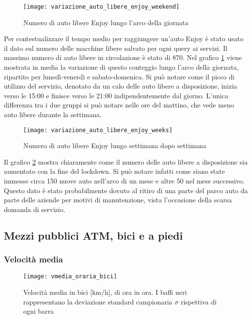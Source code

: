 \begin{figure}[H]
\texttt{[image: variazione\_auto\_libere\_enjoy\_weekend]}
\caption{Numero di auto libere Enjoy lungo l'arco della giornata}
\label{image:9}
\end{figure}

Per contestualizzare il tempo medio per raggiungere un'auto Enjoy è stato usato il dato sul numero delle macchine libere salvato per ogni query ai servizi. Il massimo numero di auto libere in circolazione è stato di 870. Nel grafico \ref{image:9} viene mostrata in media la variazione di questo conteggio lungo l'arco della giornata, ripartito per lunedì-venerdì e sabato-domenica. Si può notare come il picco di utilizzo del servizio, denotato da un calo delle auto libere a disposizione, inizia verso le 15:00 e finisce verso le 21:00 indipendentemente dal giorno. L'unica differenza tra i due gruppi si può notare nelle ore del mattino, che vede meno auto libere durante la settimana.

\begin{figure}[H]
\texttt{[image: variazione\_auto\_libere\_enjoy\_weeks]}
\caption{Numero di auto libere Enjoy lungo settimana dopo settimana}
\label{image:10}
\end{figure}

Il grafico \ref{image:10} mostra chiaramente come il numero delle auto libere a disposizione sia aumentato con la fine del lockdown. Si può notare infatti come siano state immesse circa 150 nuove auto nell'arco di un mese e altre 50 nel mese successivo. Questo dato è stato probabilmente dovuto al ritiro di una parte del parco auto da parte delle aziende per motivi di manutenzione, vista l'occasione della scarsa domanda di servizio.

\subsection{Mezzi pubblici ATM, bici e a piedi}

\subsubsection{Velocità media}

\begin{figure}[H]
	\texttt{[image: vmedia\_oraria\_bici]}
	\caption{Velocità media in bici [km/h], di ora in ora. I baffi neri rappresentano la deviazione standard campionaria $\sigma$ rispettiva di ogni barra}
	\label{image:11}
\end{figure}

